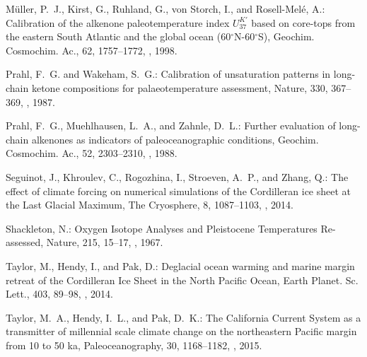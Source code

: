 \begin{thebibliography}{69}
M\"{u}ller, P.~J., Kirst, G., Ruhland, G., von Storch, I., and
  Rosell-Mel{\'{e}}, A.: Calibration of the alkenone paleotemperature index
  $U^{K'}_{37}$ based on core-tops from the eastern South Atlantic and the
  global ocean (60$^\circ$N-60$^\circ$S), Geochim. Cosmochim. Ac., 62,
  1757--1772, , 1998.

Prahl, F.~G. and Wakeham, S.~G.: Calibration of unsaturation patterns in
  long-chain ketone compositions for palaeotemperature assessment, Nature, 330,
  367--369, , 1987.

Prahl, F.~G., Muehlhausen, L.~A., and Zahnle, D.~L.: Further evaluation of
  long-chain alkenones as indicators of paleoceanographic conditions, Geochim.
  Cosmochim. Ac., 52, 2303--2310, , 1988.

Seguinot, J., Khroulev, C., Rogozhina, I., Stroeven, A.~P., and Zhang, Q.: The
  effect of climate forcing on numerical simulations of the {C}ordilleran ice
  sheet at the {L}ast {G}lacial {M}aximum, The Cryosphere, 8, 1087--1103,
  , 2014.

Shackleton, N.: Oxygen Isotope Analyses and Pleistocene Temperatures
  Re-assessed, Nature, 215, 15--17, , 1967.

Taylor, M., Hendy, I., and Pak, D.: Deglacial ocean warming and marine margin
  retreat of the Cordilleran Ice Sheet in the North Pacific Ocean, Earth
  Planet. Sc. Lett., 403, 89--98, , 2014.

Taylor, M.~A., Hendy, I.~L., and Pak, D.~K.: The California Current System as a
  transmitter of millennial scale climate change on the northeastern Pacific
  margin from 10 to 50 ka, Paleoceanography, 30, 1168--1182,
  , 2015.

\end{thebibliography}




